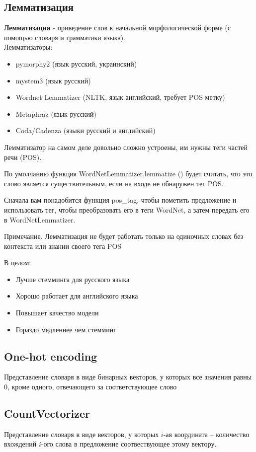 \subsection{Лемматизация}
\textbf{Лемматизация} - приведение слов к начальной морфологической форме (с помощью словаря и грамматики языка).
\\
Лемматизаторы:
\begin{itemize}
    \item pymorphy2 (язык русский, украинский)
    \item mystem3 (язык русский)
    \item Wordnet Lemmatizer (NLTK, язык английский, требует POS метку)
    \item Metaphraz (язык русский)
    \item Coda/Cadenza (языки русский и английский)
\end{itemize}

Лемматизатор на самом деле довольно сложно устроены, им нужны теги частей речи (POS).

По умолчанию функция WordNetLemmatizer.lemmatize () будет считать, что это слово является существительным, если на входе не обнаружен тег POS.

Сначала вам понадобится функция pos\_tag, чтобы пометить предложение и использовать тег, чтобы преобразовать его в теги WordNet, а затем передать его в WordNetLemmatizer.

Примечание. Лемматизация не будет работать только на одиночных словах без контекста или знании своего тега POS


В целом:

\begin{itemize}
    \item Лучше стемминга для русского языка
    \item Хорошо работает для английского языка
    \item Повышает качество модели
    \item Гораздо медленнее чем стемминг
\end{itemize}

\subsection{One-hot encoding}
Представление словаря в виде бинарных векторов, у которых все значения равны 0, кроме одного, отвечающего за соответствующее слово

\subsection{CountVectorizer}
Представление словаря в виде векторов, у которых $i$-ая координата -- количество вхождений $i$-ого слова в предложение соотвествующее этому вектору.

